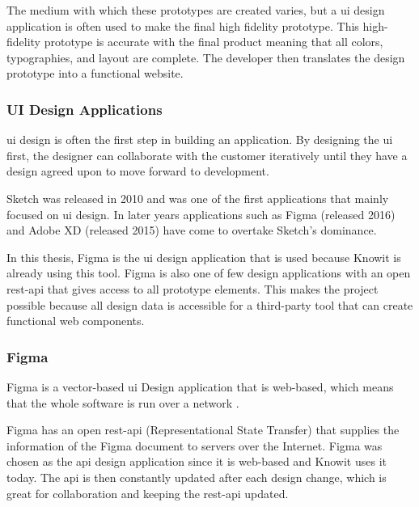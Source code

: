 The medium with which these prototypes are created varies, but a \acrfull{ui} design application is often used to make the final high fidelity prototype. This high-fidelity prototype is accurate with the final product meaning that all colors, typographies, and layout are complete. The developer then translates the design prototype into a functional website.

\subsubsection{UI Design Applications}%
\label{ssub:Apps}
\acrshort{ui} design is often the first step in building an application. By designing the \acrshort{ui} first, the designer can collaborate with the customer iteratively until they have a design agreed upon to move forward to development.

Sketch\cite{sketchDigitalDesignToolkit} was released in 2010 and was one of the first applications that mainly focused on \acrshort{ui} design. In later years applications such as Figma\cite{figmaFigmaCollaborativeInterface}  (released 2016) and Adobe XD\cite{adobeAdobeXDFast} (released 2015) have come to overtake Sketch's dominance\cite{SketchVsFigma0200}. 

In this thesis, Figma is the \acrshort{ui} design application that is used because Knowit is already using this tool. Figma is also one of few design applications with an open \acrshort{rest}-\acrshort{api} that gives access to all prototype elements. This makes the project possible because all design data is accessible for a third-party tool that can create functional web components.  

 






\subsubsection{Figma}%
\label{sub:Figma}
Figma is a vector-based \acrshort{ui} Design application that is web-based, which means that the whole software is run over a network\cite{FigmaCollaborativeInterface} . 

Figma has an open \acrshort{rest}-\acrshort{api} (Representational State Transfer) that supplies the information of the Figma document to servers over the Internet\cite{figmaFigma, RepresentationalStateTransfer2021}. Figma was chosen as the \acrshort{api} design application since it is web-based and Knowit uses it today. The \acrshort{api} is then constantly updated after each design change, which is great for collaboration and keeping the \acrshort{rest}-\acrshort{api} updated.

